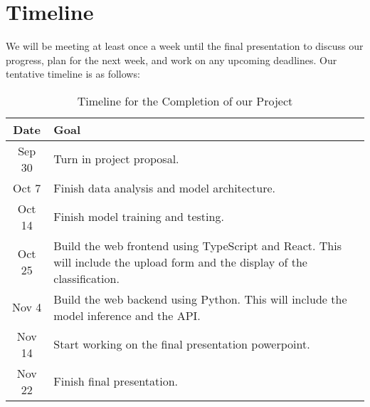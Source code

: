 \documentclass[10pt]{article}
\begin{document}
	\pagebreak
	\section{Timeline}
	We will be meeting at least once a week until the final presentation to discuss our progress, plan for the next week, and work on any upcoming deadlines. Our tentative timeline is as follows:
	\begin{table}[!ht]
		\centering
		\begin{tabular}{|| c | p{80mm} ||} 
			\hline
			Date & Goal \\ [0.5ex] 
			\hline\hline
			Sep 30 & Turn in project proposal. \\ [0.5ex]
			\hline
			Oct 7 & Finish data analysis and model architecture. \\ [0.5ex]
			\hline
			Oct 14 & Finish model training and testing. \\ [0.5ex]
			\hline
			Oct 25 & Build the web frontend using TypeScript and React. This will include the upload form and the display of the classification. \\ [0.5ex]
			\hline
			Nov 4 & Build the web backend using Python. This will include the model inference and the API. \\ [0.5ex]
			\hline
			Nov 14 & Start working on the final presentation powerpoint. \\ [0.5ex]
			\hline
			Nov 22 & Finish final presentation. \\ [0.5ex]
			\hline
		\end{tabular}
		\caption{\label{tab:timeline} Timeline for the Completion of our Project}
	\end{table}

    
	
	
\end{document}
